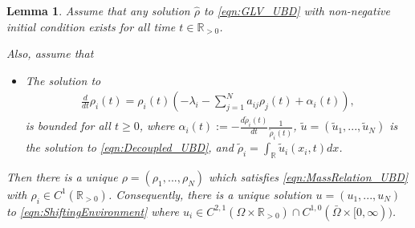\documentclass{article}
\newtheorem{lemma}{Lemma}[section]
\begin{document}
\begin{lemma}\label{lma:MassEquivalent_UBD}
Assume that any solution $\hat{\rho}$ to 
\eqref{eqn:GLV_UBD}
with non-negative initial condition exists for all time $t\in\mathbb{R}_{>0}$.

{Also, assume that}

\begin{itemize}
   \item[(G)] {The solution to}
        \begin{align*}
        \frac{d}{dt}\rho_i(t)=\rho_i(t)\left(-\lambda_i-\sum_{j=1}^Na_{ij}\rho_j(t)+\alpha_i(t)\right),
    \end{align*} 
     {is bounded for all $t\geq{0}$, where $\alpha_i(t):=-\frac{d\tilde{\rho}_i(t)}{dt}\frac{1}{\tilde{\rho}_i(t)}$, $\tilde{u}=(\tilde{u}_1,...,\tilde{u}_N)$ is the solution to \eqref{eqn:Decoupled_UBD}, and $\tilde{\rho}_i=\int_{\mathbb{R}}\tilde{u}_i(x_i,t)dx$.}
\end{itemize}



Then there is a unique $\rho=(\rho_1,...,\rho_N)$ which satisfies \eqref{eqn:MassRelation_UBD} with $\rho_i\in{}C^1(\mathbb{R}_{>0})$. Consequently, there is a unique solution $u=(u_1,...,u_N)$ to \eqref{eqn:ShiftingEnvironment} where  $u_i\in{}C^{2,1}(\Omega\times\mathbb{R}_{>0})\cap{}C^{1,0}(\bar{\Omega}\times[0,\infty))$.
\end{lemma}
\end{document}
